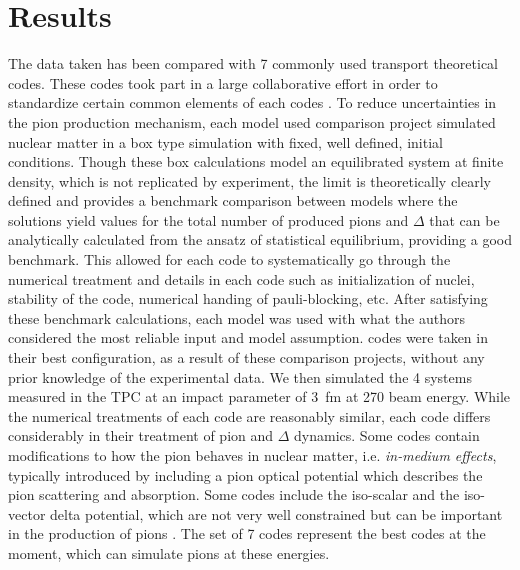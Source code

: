 \chapter{Results}

 The data taken has been compared with 7 commonly used transport theoretical codes. These codes took part in a large collaborative effort in order to standardize certain common elements of each codes \cite{theoryComp1,theoryComp2}. To reduce uncertainties in the pion production mechanism, each model used comparison project simulated nuclear matter in a box type simulation with fixed, well defined, initial conditions. Though these box calculations model an equilibrated system at finite density, which is  not replicated by experiment, the limit is theoretically clearly defined and provides a benchmark comparison between models where the solutions  yield values for the total number of produced pions and $\Delta$ that can be analytically calculated from the ansatz of  statistical equilibrium, providing a good benchmark. This allowed for each code to systematically go through the numerical treatment and details in each code such as initialization of nuclei, stability of the code, numerical handing of pauli-blocking, etc. After satisfying these benchmark calculations, each model was used with what the authors considered the most reliable input and model assumption.  codes were taken in their best configuration, as a result of these comparison projects, without any prior knowledge of the experimental data. We then simulated the 4 systems measured in the \spirit TPC at an impact parameter of \SI{3}{\femto\metre} at \SI{270}{\MeVA} beam energy. While the numerical treatments of each code are reasonably similar, each code differs considerably in their treatment of pion and $\Delta$ dynamics. Some codes contain modifications to how the pion behaves in nuclear matter, i.e. \emph{in-medium effects}, typically introduced by including a pion optical potential which describes the pion scattering and absorption. Some codes include the iso-scalar and the iso-vector delta potential, which are not very well constrained but can be important in the production of pions \cite{baoan_deltapotential,inmedPionKo,inmedPionFeng}. The set of 7 codes represent the best codes at the moment, which can simulate pions at these energies. 


